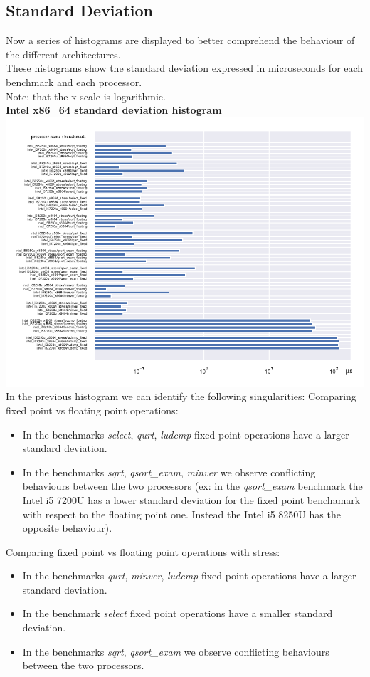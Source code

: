 \subsection{Standard Deviation}
Now a series of histograms are displayed to better comprehend the behaviour of the different architectures.\\ These histograms show the standard deviation expressed in microseconds for each benchmark and each processor.\\ Note: that the x scale is logarithmic.\\[0.2cm]
\textbf{Intel x86\_64 standard deviation histogram}\\
\hspace*{-3.2cm}
\includegraphics[width=570pt]{intel_stddev_histogram.pdf}
In the previous histogram we can identify the following singularities:
Comparing fixed point vs floating point operations:
\begin{itemize}
		\item In the benchmarks \textit{select}, \textit{qurt}, \textit{ludcmp} fixed point operations have a larger standard deviation.
		\item In the benchmarks \textit{sqrt}, \textit{qsort\_exam}, \textit{minver} we observe conflicting behaviours between the two processors (ex: in the \textit{qsort\_exam} benchmark the Intel i5 7200U has a lower standard deviation for the fixed point benchamark with respect to the floating point one. Instead the Intel i5 8250U has the opposite behaviour).
\end{itemize}
Comparing fixed point vs floating point operations with stress:
\begin{itemize}
		\item In the benchmarks \textit{qurt}, \textit{minver}, \textit{ludcmp} fixed point operations have a larger standard deviation.
		\item In the benchmark \textit{select} fixed point operations have a smaller standard deviation.
		\item In the benchmarks \textit{sqrt}, \textit{qsort\_exam} we observe conflicting behaviours between the two processors.
\end{itemize}

